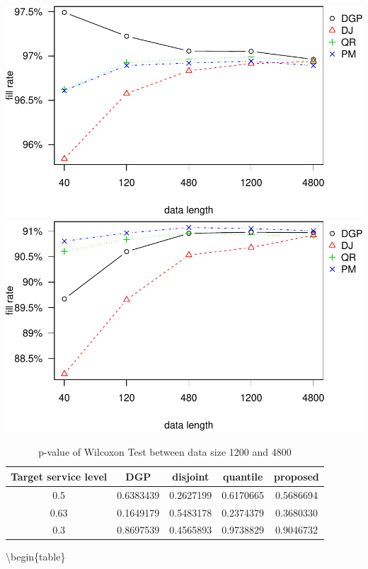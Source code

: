 \documentclass[
]{article}
\begin{document}
\includegraphics{linear-norm-plot_files/figure-latex/fr-2.pdf}
\includegraphics{linear-norm-plot_files/figure-latex/fr-3.pdf}

\begin{table}

\caption{\label{tab:Wilcoxon}p-value of Wilcoxon Test between data size 1200 and 4800}
\centering
\begin{tabular}[t]{ccccc}
\toprule
Target service level & DGP & disjoint & quantile & proposed\\
\midrule
\rowcolor{gray!6}  0.5 & 0.6383439 & 0.2627199 & 0.6170665 & 0.5686694\\
0.63 & 0.1649179 & 0.5483178 & 0.2374379 & 0.3680330\\
\rowcolor{gray!6}  0.3 & 0.8697539 & 0.4565893 & 0.9738829 & 0.9046732\\
\bottomrule
\end{tabular}
\end{table}

\textbackslash begin\{table\}
\end{document}
